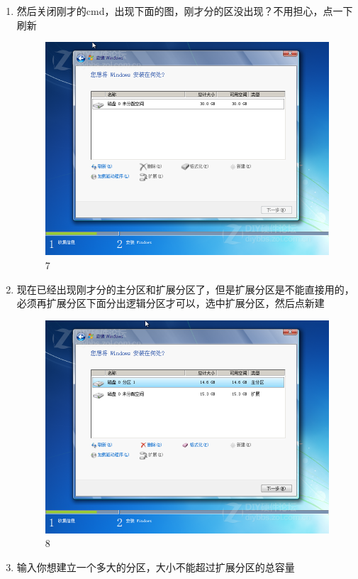 \documentclass[a4paper,12pt]{article}
\numberwithin{equation}{section}%
\begin{document}
\begin{enumerate}
\item 然后关闭刚才的cmd，出现下面的图，刚才分的区没出现？不用担心，点一下刷新
 \begin{figure}[!ht]
  \centering\includegraphics[width=5in]{7.png}
 \caption{7}
  \end{figure}\newpage

\item 现在已经出现刚才分的主分区和扩展分区了，但是扩展分区是不能直接用的，必须再扩展分区下面分出逻辑分区才可以，选中扩展分区，然后点新建

 \begin{figure}[!ht]
  \centering\includegraphics[width=5in]{8.png}
   \caption{8}
  \end{figure}\newpage

\item 输入你想建立一个多大的分区，大小不能超过扩展分区的总容量


\end{enumerate}
\end{document}
